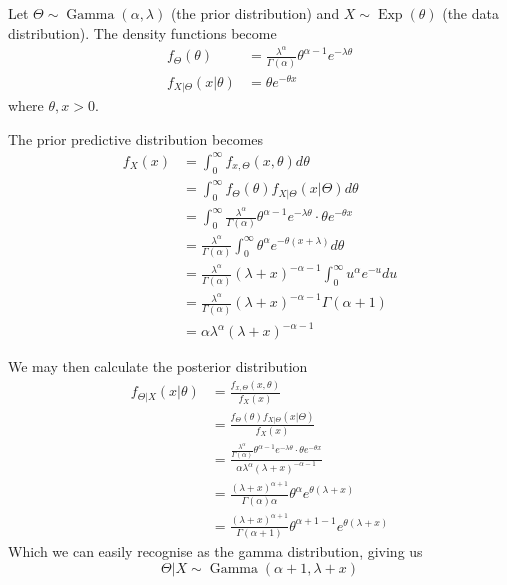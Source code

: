 \begin{example}
	Let \(\Theta \sim \operatorname{Gamma}(\alpha , \lambda)\) (the prior distribution) and \(X \sim \operatorname{Exp}(\theta) \) (the data distribution). The density functions become
	\begin{align*}
		f _{\Theta}(\theta) &= \frac{\lambda ^ \alpha }{\Gamma (\alpha )} \theta ^{\alpha -1} e ^{-\lambda \theta } \\
		f _{X | \Theta }(x | \theta ) &= \theta e ^{-\theta x}
	\end{align*}
	where \(\theta , x > 0\).

	The prior predictive distribution becomes
	\begin{align*}
		f _{X }(x) &= \int_{0}^{\infty} f _{x, \Theta }(x, \theta) d \theta \\
							 &= \int_{0}^{\infty} f _{\Theta }(\theta ) f _{X | \Theta }(x | \Theta ) d \theta \\
							 &= \int_{0}^{\infty} \frac{\lambda ^ \alpha }{\Gamma (\alpha )} \theta ^{\alpha -1} e ^{-\lambda \theta }  \cdot \theta e ^{-\theta x} \\
							 & = \frac{\lambda ^ \alpha }{\Gamma (\alpha )} \int_{0}^{\infty} \theta ^{\alpha } e ^{- \theta (x + \lambda )}d \theta \\ 
							 & = \frac{\lambda ^ \alpha }{\Gamma (\alpha )} (\lambda +x ) ^{- \alpha -1} \int_{0}^{\infty} u ^{\alpha } e ^{- u}du \\
							 & = \frac{\lambda ^ \alpha }{\Gamma (\alpha )} (\lambda +x ) ^{- \alpha -1} \Gamma(\alpha+1) \\
							 & = \alpha \lambda ^ \alpha  (\lambda +x ) ^{- \alpha -1}
	\end{align*}

	We may then calculate the posterior distribution
	\begin{align*}
		f _{\Theta |X}(x | \theta ) &= \frac{ f _{x, \Theta }(x, \theta) }{f _X (x)} \\
																&= \frac{f _{\Theta }(\theta ) f _{X | \Theta }(x | \Theta ) }{f _{X}(x)}  \\
																&= \frac{\frac{\lambda ^ \alpha }{\Gamma (\alpha )} \theta ^{\alpha -1} e ^{-\lambda \theta }  \cdot \theta e ^{-\theta x}}{\alpha \lambda ^ \alpha  (\lambda +x ) ^{- \alpha -1}} \\
																&= \frac{(\lambda + x)^{\alpha +1}}{\Gamma(\alpha ) \alpha } \theta ^{\alpha} e ^{\theta (\lambda +x)}\\
																&= \frac{(\lambda + x)^{\alpha +1}}{\Gamma(\alpha +1)} \theta ^{\alpha + 1 -1} e ^{\theta (\lambda +x)}
	\end{align*}
	Which we can easily recognise as the gamma distribution, giving us
	\[
		\Theta | X \sim \operatorname{Gamma}(\alpha +1, \lambda + x)  
	\]

	
\end{example}

